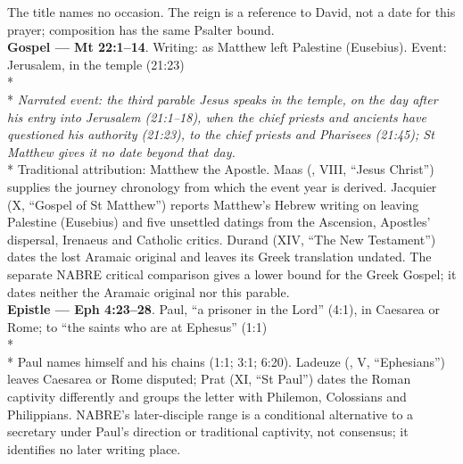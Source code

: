 \begin{passagedossiertable}
The title  names no occasion. The reign is a reference to David, not a date for this prayer; composition has the same Psalter bound.\\
\midrule
\textbf{Gospel --- Mt 22:1--14}. Writing: as Matthew left Palestine (Eusebius). Event:
Jerusalem, in the temple (21:23)\\*
\\*
\textit{Narrated event: the third parable Jesus speaks in the temple, on
the day after his entry into Jerusalem (21:1--18), when the chief priests and
ancients have questioned his authority (21:23), to the chief priests and
Pharisees (21:45); St Matthew gives it no date beyond that day.}\\*
Traditional attribution: Matthew the Apostle. Maas (, VIII, ``Jesus Christ'') supplies the journey chronology from which the event year is derived. Jacquier (X, ``Gospel of St Matthew'') reports Matthew's Hebrew writing on leaving Palestine (Eusebius) and five unsettled datings from the Ascension, Apostles' dispersal, Irenaeus and Catholic critics. Durand (XIV, ``The New Testament'') dates the lost Aramaic original and leaves its Greek translation undated. The separate NABRE critical comparison gives a lower bound for the Greek Gospel; it dates neither the Aramaic original nor this parable.\\
\midrule
\textbf{Epistle --- Eph 4:23--28}. Paul, ``a prisoner in the Lord'' (4:1), in Caesarea or
Rome; to ``the saints who are at Ephesus'' (1:1)\\*
\\*
Paul names himself and his chains (1:1; 3:1; 6:20). Ladeuze (, V, ``Ephesians'') leaves Caesarea or Rome disputed; Prat (XI, ``St Paul'') dates the Roman captivity differently and groups the letter with Philemon, Colossians and Philippians. NABRE's later-disciple range is a conditional alternative to a secretary under Paul's direction or traditional captivity, not consensus; it identifies no later writing place.\\
\end{passagedossiertable}
